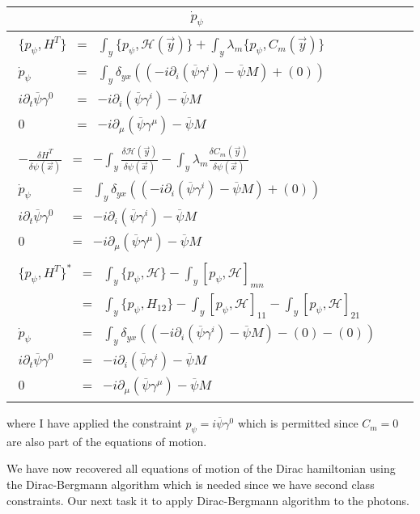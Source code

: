 \documentclass[aps,preprint,preprintnumbers,nofootinbib,showpacs,prd]{revtex4-1}
\newcommand{\ba}{\begin{array}}
\newcommand{\ea}{\end{array}}
\begin{document}
\begin{center}
    \begin{tabular}{ | l |}
    \hline
    \multicolumn{1}{|c|}{$\dot p_\psi$} \\
    \hline
    $\ba {rcl}
\{p_\psi, H^T\} & = & \int_y\{p_\psi, \mathcal{H}(\vec y)\} + \int_y \lambda_m \{p_\psi, C_m(\vec y)\} \\
\dot p_\psi& = & \int_y \delta_{yx} ((-i \partial_{i}(\overline \psi \gamma^{i}) - \overline \psi M) + (0)) \\
i \partial_t \overline \psi \gamma^0 & = & -i \partial_{i}(\overline \psi \gamma^{i}) - \overline \psi M \\
0 & = & -i \partial_{\mu}(\overline \psi \gamma^{\mu}) - \overline \psi M
\ea$
      \\ \cline{1-1}
    $\ba {rcl}
-\frac{\delta H^T}{\delta \psi(\vec x)} & = & -\int_y\frac{\delta \mathcal{H}(\vec y)}{\delta \psi(\vec x)} - \int_y \lambda_m \frac{\delta C_m(\vec y)}{\delta \psi(\vec x)} \\
\dot p_\psi& = & \int_y \delta_{yx} ((-i \partial_{i}(\overline \psi \gamma^{i}) - \overline \psi M) + (0)) \\
i \partial_t \overline \psi \gamma^0 & = & -i \partial_{i}(\overline \psi \gamma^{i}) - \overline \psi M \\
0 & = & -i \partial_{\mu}(\overline \psi \gamma^{\mu}) - \overline \psi M
\ea$
      \\ \cline{1-1}
   $\ba {rcl}
\{p_\psi, H^T\}^* & = & \int_y \{p_\psi, \mathcal{H}\} - \int_y [p_\psi, \mathcal{H}]_{mn} \\
& = & \int_y\{p_\psi, H_{12}\} - \int_y[p_\psi, \mathcal{H}]_{11} -\int_y [p_\psi, \mathcal{H}]_{21} \\
\dot p_\psi& = & \int_y \delta_{yx} ((-i \partial_{i}(\overline \psi \gamma^{i}) - \overline \psi M) - (0) - (0)) \\
i \partial_t \overline \psi \gamma^0 & = & -i \partial_{i}(\overline \psi \gamma^{i}) - \overline \psi M \\
0 & = & -i \partial_{\mu}(\overline \psi \gamma^{\mu}) - \overline \psi M
\ea$
     \\
    \hline
    \end{tabular}
\end{center}
where I have applied the constraint $p_\psi = i\overline\psi\gamma^0$ which is permitted since $C_m = 0$ are also part of the equations of motion.

We have now recovered all equations of motion of the Dirac hamiltonian using the Dirac-Bergmann algorithm which is needed since we have second class constraints. Our next task it to apply Dirac-Bergmann algorithm to the photons.
\end{document}
